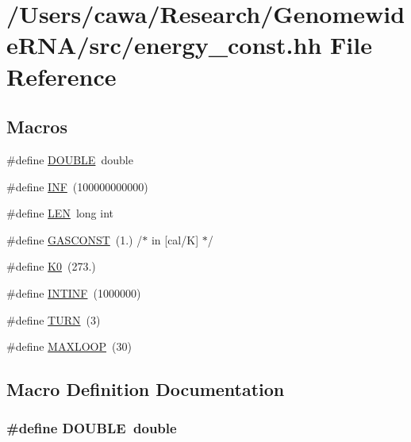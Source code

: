 \hypertarget{energy__const_8hh}{\section{/\+Users/cawa/\+Research/\+Genomewide\+R\+N\+A/src/energy\+\_\+const.hh File Reference}
\label{energy__const_8hh}
}
\subsection*{Macros}
\begin{DoxyCompactItemize}
\item 
\#define \hyperlink{energy__const_8hh_a8747af38b86aa2bbcda2f1b1aa0888c2}{D\+O\+U\+B\+L\+E}~double
\item 
\#define \hyperlink{energy__const_8hh_a12c2040f25d8e3a7b9e1c2024c618cb6}{I\+N\+F}~(100000000000)
\item 
\#define \hyperlink{energy__const_8hh_a05b49c662c073f89e86804f7856622a0}{L\+E\+N}~long int
\item 
\#define \hyperlink{energy__const_8hh_ab1e4a8d82f24ed5db01dde5f25269cf1}{G\+A\+S\+C\+O\+N\+S\+T}~(1.)  /$\ast$ in \mbox{[}cal/K\mbox{]} $\ast$/
\item 
\#define \hyperlink{energy__const_8hh_a307c72605e3713972b4f4fb2d53ea20e}{K0}~(273.)
\item 
\#define \hyperlink{energy__const_8hh_a0394650c03180f81bb6faa14a89201dc}{I\+N\+T\+I\+N\+F}~(1000000)
\item 
\#define \hyperlink{energy__const_8hh_ae646250fd59311356c7e5722a81c3a96}{T\+U\+R\+N}~(3)
\item 
\#define \hyperlink{energy__const_8hh_ad1bd6eabac419670ddd3c9ed82145988}{M\+A\+X\+L\+O\+O\+P}~(30)
\end{DoxyCompactItemize}


\subsection{Macro Definition Documentation}
\hypertarget{energy__const_8hh_a8747af38b86aa2bbcda2f1b1aa0888c2}{
\subsubsection[{D\+O\+U\+B\+L\+E}]{\setlength{\rightskip}{0pt plus 5cm}\#define D\+O\+U\+B\+L\+E~double}}\label{energy__const_8hh_a8747af38b86aa2bbcda2f1b1aa0888c2}


